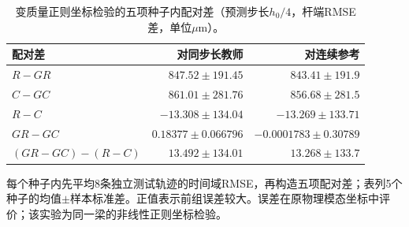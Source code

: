 \begin{table}[t]
\centering\small
\caption{变质量正则坐标检验的五项种子内配对差（预测步长$h_0/4$，杆端RMSE差，单位$\mu\mathrm m$）。}
\label{tab:variable_mass_paired}
\begin{tabular}{lrr}
\toprule
配对差 & 对同步长教师 & 对连续参考 \\
\midrule
$R-GR$ & $847.52\pm191.45$ & $843.41\pm191.9$ \\
$C-GC$ & $861.01\pm281.76$ & $856.68\pm281.5$ \\
$R-C$ & $-13.308\pm134.04$ & $-13.269\pm133.71$ \\
$GR-GC$ & $0.18377\pm0.066796$ & $-0.0001783\pm0.30789$ \\
$(GR-GC)-(R-C)$ & $13.492\pm134.01$ & $13.268\pm133.7$ \\
\bottomrule
\end{tabular}
\par\smallskip\begin{minipage}{0.96\textwidth}\footnotesize 每个种子内先平均8条独立测试轨迹的时间域RMSE，再构造五项配对差；表列5个种子的均值$\pm$样本标准差。正值表示前组误差较大。误差在原物理模态坐标中评价；该实验为同一梁的非线性正则坐标检验。\end{minipage}
\end{table}
